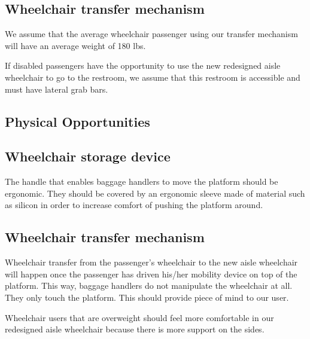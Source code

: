 \subsection*{Wheelchair transfer mechanism}

\begin{list}{-}{}
  \item We assume that the average wheelchair passenger using our transfer mechanism will have an average weight of 180 lbs.
  \item If disabled passengers have the opportunity to use the new redesigned aisle wheelchair to go to the restroom, we assume that this restroom is accessible and must have lateral grab bars.
\end{list}

\newpage

\subsection{Physical Opportunities}

\subsection*{Wheelchair storage device}

\begin{list}{-}{}
  \item The handle that enables baggage handlers to move the platform should be ergonomic. They should be covered by an ergonomic sleeve made of material such as silicon in order to increase comfort of pushing the platform around.
\end{list}

\subsection*{Wheelchair transfer mechanism}

\begin{list}{-}{}
  \item Wheelchair transfer from the passenger's wheelchair to the new aisle wheelchair will happen once the passenger has driven his/her mobility device on top of the platform. This way, baggage handlers do not manipulate the wheelchair at all. They only touch the platform. This should provide piece of mind to our user.
  \item Wheelchair users that are overweight should feel more comfortable in our redesigned aisle wheelchair because there is more support on the sides.
\end{list}

